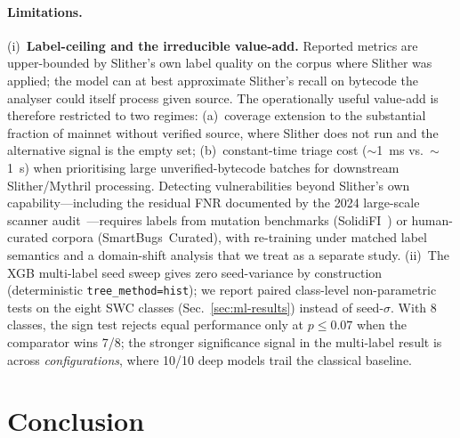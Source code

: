\documentclass[twocolumn, 10pt]{article}
\begin{document}
\paragraph{Limitations.}
(i)~\textbf{Label-ceiling and the irreducible value-add.}
Reported metrics are upper-bounded by Slither's own label quality
on the corpus where Slither was applied; the model can at best
approximate Slither's recall on bytecode the analyser could itself
process given source. The operationally useful value-add is
therefore restricted to two regimes: (a)~coverage extension to the
substantial fraction of mainnet without verified source, where
Slither does not run and the alternative signal is the empty set;
(b)~constant-time triage cost ($\sim$1~ms vs.\ $\sim$1~s) when
prioritising large unverified-bytecode batches for downstream
Slither/Mythril processing. Detecting vulnerabilities beyond
Slither's own capability---including the residual FNR documented
by the 2024 large-scale scanner audit~\cite{scannerstudy}---requires
labels from mutation benchmarks (SolidiFI~\cite{solidifi}) or
human-curated corpora (SmartBugs~Curated), with re-training under
matched label semantics and a domain-shift analysis that we treat
as a separate study.
(ii)~The XGB multi-label seed sweep gives zero seed-variance by
construction (deterministic \texttt{tree\_method=hist}); we report
paired class-level non-parametric tests on the eight SWC classes
(Sec.~\ref{sec:ml-results}) instead of seed-$\sigma$. With 8
classes, the sign test rejects equal performance only at
$p\!\le\!0.07$ when the comparator wins 7/8; the stronger
significance signal in the multi-label result is across
\emph{configurations}, where 10/10 deep models trail the classical
baseline.

\section{Conclusion}\label{sec:conc}
\end{document}
